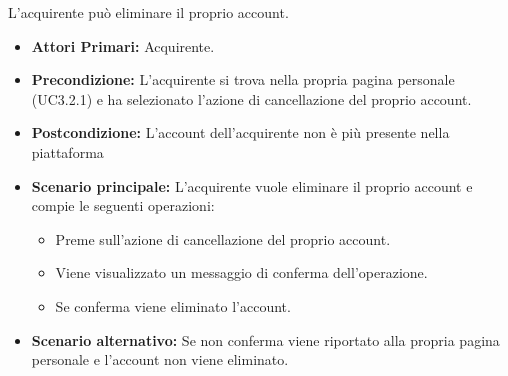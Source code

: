 L'acquirente può eliminare il proprio account.
\begin{itemize}
    \item \textbf{Attori Primari:} Acquirente.
    \item \textbf{Precondizione:} L'acquirente si trova nella propria pagina personale (UC3.2.1) e ha selezionato l'azione di cancellazione del proprio account.
    \item \textbf{Postcondizione:} L'account dell'acquirente non è più presente nella piattaforma
    \item \textbf{Scenario principale:} L'acquirente vuole eliminare il proprio account e compie le seguenti operazioni:
    \begin{itemize}
        \item Preme sull'azione di cancellazione del proprio account.
        \item Viene visualizzato un messaggio di conferma dell'operazione.
        \item Se conferma viene eliminato l'account.
    \end{itemize}
    \item \textbf{Scenario alternativo:} Se non conferma viene riportato alla propria pagina personale e l'account non viene eliminato.
\end{itemize}
